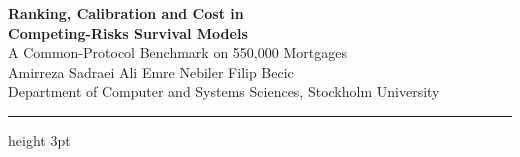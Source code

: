 \documentclass[final]{article}
\begin{document}
\begin{center}
{\fontsize{88}{100}\selectfont\bfseries\color{su}
Ranking, Calibration and Cost in\\[3mm] Competing-Risks Survival Models}\\[6mm]
{\fontsize{42}{50}\selectfont A Common-Protocol Benchmark on 550{,}000 Mortgages}\\[8mm]
{\fontsize{38}{46}\selectfont Amirreza Sadraei \quad\textbullet\quad Ali Emre Nebiler \quad\textbullet\quad Filip Becic}\\[3mm]
{\fontsize{39}{48}\selectfont Department of Computer and Systems Sciences, Stockholm University}
\end{center}
\vspace{4mm}
{\color{su}\hrule height 3pt}
\vspace{8mm}
\end{document}
